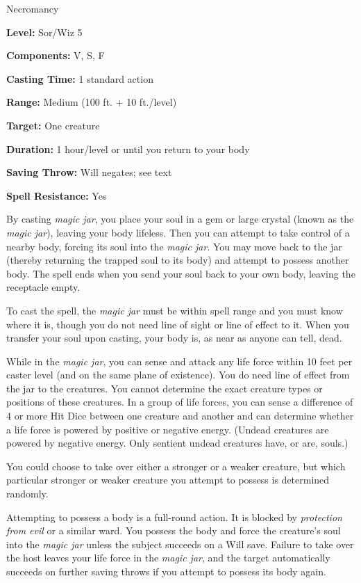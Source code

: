 
Necromancy

\textbf{Level:} Sor/Wiz 5

\textbf{Components:} V, S, F

\textbf{Casting Time:} 1 standard action

\textbf{Range:} Medium (100 ft. + 10 ft./level)

\textbf{Target:} One creature

\textbf{Duration:} 1 hour/level or until you return to your body

\textbf{Saving Throw:} Will negates; see text

\textbf{Spell Resistance:} Yes

By casting \textit{magic jar}, you place your soul in a gem or large crystal (known 
as the \textit{magic jar}), leaving your body lifeless. Then you can attempt to 
take control of a nearby body, forcing its soul into the \textit{magic jar}. You 
may move back to the jar (thereby returning the trapped soul to its body) and attempt 
to possess another body. The spell ends when you send your soul back to your own 
body, leaving the receptacle empty.

To cast the spell, the \textit{magic jar} must be within spell range and you must 
know where it is, though you do not need line of sight or line of effect to it. 
When you transfer your soul upon casting, your body is, as near as anyone can tell, 
dead. 

While in the \textit{magic jar}, you can sense and attack any life force within 
10 feet per caster level (and on the same plane of existence). You do need line 
of effect from the jar to the creatures. You cannot determine the exact creature 
types or positions of these creatures. In a group of life forces, you can sense 
a difference of 4 or more Hit Dice between one creature and another and can determine 
whether a life force is powered by positive or negative energy. (Undead creatures 
are powered by negative energy. Only sentient undead creatures have, or are, souls.)

You could choose to take over either a stronger or a weaker creature, but which 
particular stronger or weaker creature you attempt to possess is determined randomly.

Attempting to possess a body is a full-round action. It is blocked by \textit{protection 
from evil} or a similar ward. You possess the body and force the creature's soul 
into the \textit{magic jar} unless the subject succeeds on a Will save. Failure 
to take over the host leaves your life force in the \textit{magic jar}, and the 
target automatically succeeds on further saving throws if you attempt to possess 
its body again.

